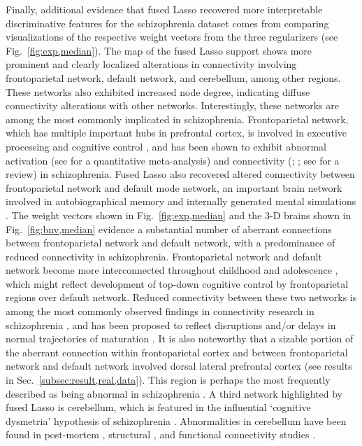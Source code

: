Finally, additional evidence that fused Lasso recovered more interpretable discriminative features for the schizophrenia dataset comes from comparing visualizations of the respective weight vectors from the three regularizers (see Fig.~\ref{fig:exp,median}). 
The map of the fused Lasso support shows more prominent and clearly localized alterations in connectivity involving frontoparietal network, default network, and cerebellum, among other regions. These networks also exhibited increased node degree, indicating diffuse connectivity alterations with other networks. 
Interestingly, these networks are among the most commonly implicated in schizophrenia.
Frontoparietal network, which has multiple important hubs in prefrontal cortex, is involved in executive processing and cognitive control \citep{Cole:2013}, and has been shown to exhibit abnormal activation (see \cite{Minzenberg:2009} for a quantitative meta-analysis) and connectivity (\cite{Repovs:2011}; \cite{Tu:2013}; see \cite{Fornito:2012} for a review) in schizophrenia. 
Fused Lasso also recovered altered connectivity between frontoparietal network and default mode network, an important brain network involved in autobiographical memory and internally generated mental simulations \citep{Buckner:2008, Raichle:2001}. 
The weight vectors shown in Fig.~\ref{fig:exp,median} and the $3$-D brains shown in Fig.~\ref{fig:bnv,median} evidence a substantial number of aberrant connections between frontoparietal network and default network, with a predominance of reduced connectivity in schizophrenia. 
Frontoparietal network and default network become more interconnected throughout childhood and adolescence \citep{Fair:2007,Anderson:2011}, which might reflect development of top-down cognitive control by frontoparietal regions over default network. 
Reduced connectivity between these two networks is among the most commonly observed findings in connectivity research in schizophrenia \citep{Jafri:2008, Repovs:2011, Woodward:2011, Zhou:2007a, Zhou:2007b}, and has been proposed to reflect disruptions and/or delays in normal trajectories of maturation \citep{Repovs:2011}.
It is also noteworthy that a sizable portion of the aberrant connection within frontoparietal cortex and between frontoparietal network and default network involved dorsal lateral prefrontal cortex (see results in Sec.~\ref{subsec:result,real,data}). 
This region is perhaps the most frequently described as being abnormal in schizophrenia \citep{Bunney:2000, Callicott:2000, Zhou:2007a}. 
A third network highlighted by fused Lasso is cerebellum, which is featured in the influential `cognitive dysmetria' hypothesis of schizophrenia \citep{Andreasen:1998}. 
Abnormalities in cerebellum have been found in post-mortem \citep{Weinberger:1980}, structural \citep{Wassink:1999}, and functional connectivity studies \citep{Mamah:2013}. 

